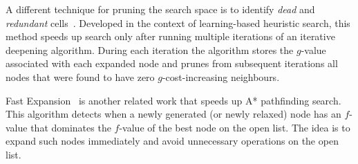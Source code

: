 A different technique for pruning the search space is to identify \emph{dead} and \emph{redundant}
cells~\cite{sturtevant10b}.  Developed in the context of learning-based heuristic search, this
method speeds up search only after running multiple iterations of an iterative deepening algorithm.
During each iteration the algorithm stores the $g$-value associated with each expanded node and
prunes from subsequent iterations all nodes that were found to have zero $g$-cost-increasing
neighbours.

Fast Expansion~\cite{sun09} is another related work that speeds up A* pathfinding search. 
This algorithm detects when a newly generated (or newly relaxed) node has an $f$-value that 
dominates the $f$-value of the best node on the open list. The idea is to expand such nodes 
immediately and avoid unnecessary operations on the open list.
